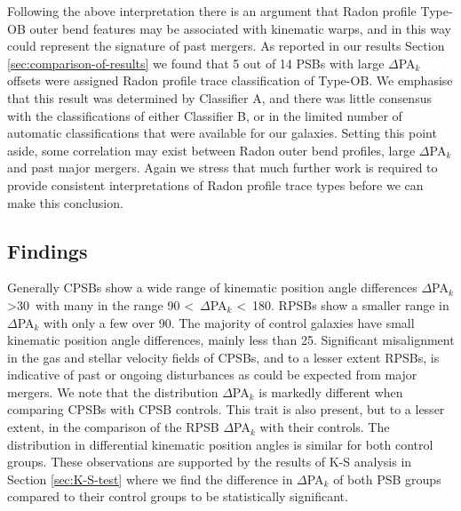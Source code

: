 Following the above interpretation there is an argument that Radon profile Type-OB outer bend features may be associated with kinematic warps, and in this way could represent the signature of past mergers. 
As reported in our results Section \ref{sec:comparison-of-results} we found that 5 out of 14 PSBs with large $\Delta$PA$_{k}$ offsets were assigned Radon profile trace classification of Type-OB. We emphasise that this result was determined by Classifier A, and there was little consensus with the classifications of either Classifier B, or in the limited number of automatic classifications that were available for our galaxies. Setting this point aside, some correlation may exist between Radon outer bend profiles, large $\Delta$PA$_{k}$ and past major mergers. Again we stress that much further work is required to provide consistent interpretations of Radon profile trace types before we can make this conclusion.

\subsection{Findings}
\label{findings}


Generally CPSBs show a wide range of kinematic position angle differences $\Delta$PA$_{k}$ \textgreater 30\textdegree\ with many in the range 90 \textless\ $\Delta$PA$_{k}$ \textless\ 180\textdegree. RPSBs show a smaller range in $\Delta$PA$_{k}$ with only a few over 90\textdegree. The majority of control galaxies have small kinematic position angle differences, mainly less than 25\textdegree. Significant misalignment in the gas and stellar velocity fields of CPSBs, and to a lesser extent RPSBs, is indicative of past or ongoing disturbances as could be expected from major mergers.
We note that the distribution $\Delta$PA$_{k}$ is markedly different when comparing CPSBs with CPSB controls. This trait is also present, but to a lesser extent, in the comparison of the RPSB $\Delta$PA$_{k}$ with their controls. The distribution in differential kinematic position angles is similar for both control groups. These observations are supported by the results of K-S analysis in Section \ref{sec:K-S-test} where we find the difference in $\Delta$PA$_{k}$ of both PSB groups compared to their control groups to be statistically significant. 

